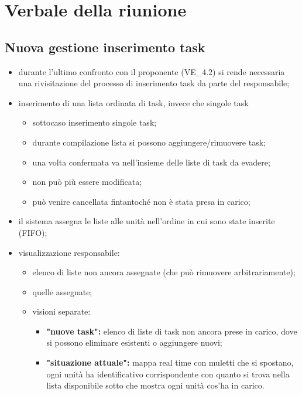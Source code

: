 \section{Verbale della riunione}

\subsection{Nuova gestione inserimento task}
\label{newtask}
    \begin{itemize}
        \item durante l'ultimo confronto con il proponente (VE\_4.2) si rende necessaria una rivisitazione del processo di inserimento task da parte del responsabile;
        \item inserimento di una lista ordinata di task, invece che singole task
        \begin{itemize}
            \item sottocaso inserimento singole task;
            \item durante compilazione lista si possono aggiungere/rimuovere task;
            \item una volta confermata va nell'insieme delle liste di task da evadere;
            \item non può più essere modificata;
            \item può venire cancellata fintantoché non è stata presa in carico;
        \end{itemize}
        \item il sistema assegna le liste alle unità nell'ordine in cui sono state inserite (FIFO);
        \item visualizzazione responsabile:
            \begin{itemize}
                \item elenco di liste non ancora assegnate (che può rimuovere arbitrariamente);

                \item quelle assegnate;

                \item visioni separate:
                \begin{itemize}
                    \item \textbf{"nuove task": }elenco di liste di task non ancora prese in carico, dove si possono eliminare esistenti  o aggiungere nuovi;
                    \item \textbf{"situazione attuale": } mappa real time con muletti che si spostano, ogni unità ha identificativo corrispondente con quanto si trova nella lista disponibile sotto che mostra ogni unità cos'ha in carico.
                \end{itemize}
            \end{itemize}
    \end{itemize}
